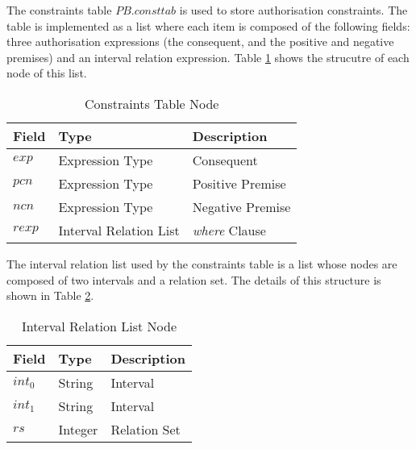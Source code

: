\documentclass[11pt]{report}
\begin{document}
        The constraints table $PB$.$consttab$ is used to store authorisation
        constraints. The table is implemented as a list where each item is
        composed of the following fields: three authorisation expressions
        (the consequent, and the positive and negative premises) and an
        interval relation expression. Table \ref{tabl-impln-cntab} shows the
        strucutre of each node of this list.

        \begin{table}[tbhp]
          \begin{center}
            \begin{tabular}[t]{|l|l|l|}
              \hline
              \textbf{Field} & \textbf{Type}          & \textbf{Description} \\
              \hline                                  
              $exp$          & Expression Type        & Consequent \\
              \hline                                  
              $pcn$          & Expression Type        & Positive Premise \\
              \hline
              $ncn$          & Expression Type        & Negative Premise \\
              \hline
              $rexp$         & Interval Relation List & {\em where} Clause \\
              \hline
            \end{tabular}
          \end{center}
          \caption{Constraints Table Node}
          \label{tabl-impln-cntab}
        \end{table}

        The interval relation list used by the constraints table is a list
        whose nodes are composed of two intervals and a relation set. The
        details of this structure is shown in Table \ref{tabl-impln-irlst}.

        \begin{table}[tbhp]
          \begin{center}
            \begin{tabular}[t]{|l|l|l|}
              \hline
              \textbf{Field} & \textbf{Type}          & \textbf{Description} \\
              \hline                                  
              $int_0$        & String                 & Interval \\
              \hline                                  
              $int_1$        & String                 & Interval \\
              \hline
              $rs$           & Integer                & Relation Set \\
              \hline
            \end{tabular}
          \end{center}
          \caption{Interval Relation List Node}
          \label{tabl-impln-irlst}
        \end{table}
\end{document}
